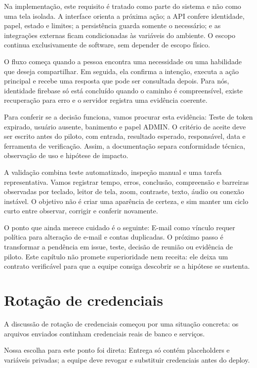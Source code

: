 \documentclass[12pt,oneside,a4paper,article]{abntex2}
\begin{document}
Na implementação, este requisito é tratado como parte do sistema e não como uma tela isolada. A interface orienta a próxima ação; a API confere identidade, papel, estado e limites; a persistência guarda somente o necessário; e as integrações externas ficam condicionadas às variáveis do ambiente. O escopo continua exclusivamente de software, sem depender de escopo físico.

O fluxo começa quando a pessoa encontra uma necessidade ou uma habilidade que deseja compartilhar. Em seguida, ela confirma a intenção, executa a ação principal e recebe uma resposta que pode ser consultada depois. Para nós, identidade firebase só está concluído quando o caminho é compreensível, existe recuperação para erro e o servidor registra uma evidência coerente.

Para conferir se a decisão funciona, vamos procurar esta evidência: Teste de token expirado, usuário ausente, banimento e papel ADMIN. O critério de aceite deve ser escrito antes do piloto, com entrada, resultado esperado, responsável, data e ferramenta de verificação. Assim, a documentação separa conformidade técnica, observação de uso e hipótese de impacto.

A validação combina teste automatizado, inspeção manual e uma tarefa representativa. Vamos registrar tempo, erros, conclusão, compreensão e barreiras observadas por teclado, leitor de tela, zoom, contraste, texto, áudio ou conexão instável. O objetivo não é criar uma aparência de certeza, e sim manter um ciclo curto entre observar, corrigir e conferir novamente.

O ponto que ainda merece cuidado é o seguinte: E-mail como vínculo requer política para alteração de e-mail e contas duplicadas. O próximo passo é transformar a pendência em issue, teste, decisão de reunião ou evidência de piloto. Este capítulo não promete superioridade nem receita: ele deixa um contrato verificável para que a equipe consiga descobrir se a hipótese se sustenta.

\section{Rotação de credenciais}
A discussão de rotação de credenciais começou por uma situação concreta: os arquivos enviados continham credenciais reais de banco e serviços.

Nossa escolha para este ponto foi direta: Entrega só contém placeholders e variáveis privadas; a equipe deve revogar e substituir credenciais antes do deploy.
\end{document}
